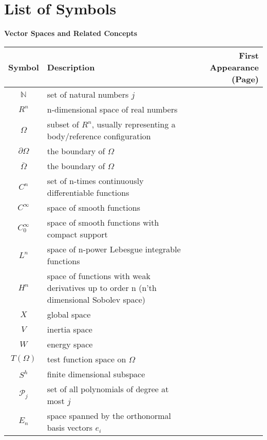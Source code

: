 \documentclass[main.tex]{subfiles}
\begin{document}
\chapter*{List of Symbols}

\noindent
\textbf{Vector Spaces and Related Concepts}\\
\begin{tabularx}{\textwidth}{cXr}
\toprule
Symbol & Description & First Appearance (Page) \\ 
\midrule
\( \mathbb{N} \) & set of natural numbers \( j \) & \pageref{sym:natural} \\
\( R^n \) & n-dimensional space of real numbers & \pageref{sym:Rn} \\
\( \Omega \) & subset of \( R^n \), usually representing a body/reference configuration & \pageref{sym:Omega} \\
\( \partial \Omega \) & the boundary of $\Omega$ & \pageref{sym:boundaryOmega} \\
\( \bar{\Omega} \) & the boundary of $\Omega$ & \pageref{sym:baromega} \\
\( C^n \) & set of n-times continuously differentiable functions & \pageref{sym:Cn} \\
\( C^\infty \) & space of smooth functions & \pageref{sym:Cinfty} \\
\( C^\infty_0 \) & space of smooth functions with compact support & \pageref{sym:Cinftyzero} \\
\( L^n \) & space of n-power Lebesgue integrable functions & \pageref{sym:Ln} \\
\( H^n \) & space of functions with weak derivatives up to order n (n'th dimensional Sobolev space) & \pageref{sym:Hn} \\
\( X \) & global space & \pageref{sym:Xspace} \\
\( V \) & inertia space & \pageref{sym:Wspace} \\
\( W \) & energy space & \pageref{sym:Vspace} \\
\( T(\Omega) \) & test function space on \( \Omega \) & \pageref{sym:TOmega} \\
\( S^h \) & finite dimensional subspace & \pageref{sym:Sh1} \\
\( \mathcal{P}_j \) & set of all polynomials of degree at most \( j \) & \pageref{sym:poly} \\
\( E_n \) & space spanned by the orthonormal basis vectors $e_i$ & \pageref{sym:En} \\


\bottomrule
\end{tabularx}
\end{document}
